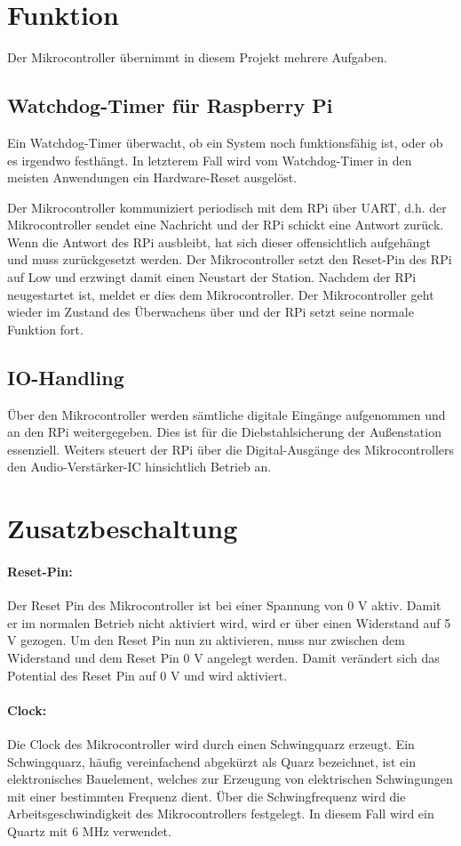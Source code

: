 \section{Funktion}
Der Mikrocontroller übernimmt in diesem Projekt mehrere Aufgaben.
\subsection{Watchdog-Timer für Raspberry Pi}
Ein Watchdog-Timer überwacht, ob ein System noch funktionsfähig ist, oder ob es irgendwo festhängt.
In letzterem Fall wird vom Watchdog-Timer in den meisten Anwendungen ein Hardware-Reset ausgelöst.\par

Der Mikrocontroller kommuniziert periodisch mit dem RPi über UART, d.h. der Mikrocontroller sendet eine Nachricht und der RPi schickt eine Antwort zurück.
Wenn die Antwort des RPi ausbleibt, hat sich dieser offensichtlich aufgehängt und muss zurückgesetzt werden.
Der Mikrocontroller setzt den Reset-Pin des RPi auf Low und erzwingt damit einen Neustart der Station.
Nachdem der RPi neugestartet ist, meldet er dies dem Mikrocontroller.
Der Mikrocontroller geht wieder im Zustand des Überwachens über und der RPi setzt seine normale Funktion fort.

\subsection{IO-Handling}
Über den Mikrocontroller werden sämtliche digitale Eingänge aufgenommen und an den RPi weitergegeben.
Dies ist für die Diebstahlsicherung der Außenstation essenziell.
Weiters steuert der RPi über die Digital-Ausgänge des Mikrocontrollers den Audio-Verstärker-IC hinsichtlich Betrieb an.

\section{Zusatzbeschaltung}
\paragraph{Reset-Pin:}
Der Reset Pin des Mikrocontroller ist bei einer Spannung von 0 V aktiv.
Damit er im normalen Betrieb nicht aktiviert wird, wird er über einen Widerstand auf 5 V gezogen.
Um den Reset Pin nun zu aktivieren, muss nur zwischen dem Widerstand und dem Reset Pin 0 V angelegt werden.
Damit verändert sich das Potential des Reset Pin auf 0 V und wird aktiviert.

\paragraph{Clock:}
Die Clock des Mikrocontroller wird durch einen Schwingquarz erzeugt.
Ein Schwingquarz, häufig vereinfachend abgekürzt als Quarz bezeichnet, ist ein elektronisches Bauelement, welches zur Erzeugung von elektrischen Schwingungen mit einer bestimmten Frequenz dient.
Über die Schwingfrequenz wird die Arbeitsgeschwindigkeit des Mikrocontrollers festgelegt.
In diesem Fall wird ein Quartz mit 6 MHz verwendet.